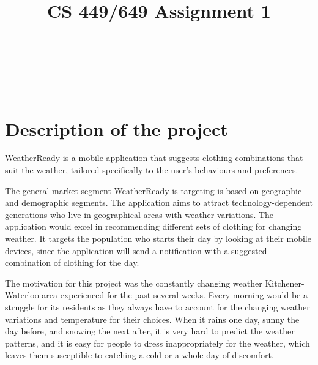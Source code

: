 \documentclass{sigchi}
\def\plaintitle{CS 449/649 Assignment 1}
\begin{document}
\title{\plaintitle}

\author{%
  \\
\\
\\
\\
}

\maketitle


\section{Description of the project}

WeatherReady is a mobile application that suggests clothing combinations that suit the weather, tailored specifically to the user's behaviours and preferences.

The general market segment WeatherReady is targeting is based on geographic and demographic segments. The application aims to attract technology-dependent generations who live in geographical areas with weather variations. The application would excel in recommending different sets of clothing for changing weather. It targets the population who starts their day by looking at their mobile devices, since the application will send a notification with a suggested combination of clothing for the day.

The motivation for this project was the constantly changing weather Kitchener-Waterloo area experienced for the past several weeks. Every morning would be a struggle for its residents as they always have to account for the changing weather variations and temperature for their choices. When it rains one day, sunny the day before, and snowing the next after, it is very hard to predict the weather patterns, and it is easy for people to dress inappropriately for the weather, which leaves them susceptible to catching a cold or a whole day of discomfort.
\end{document}

